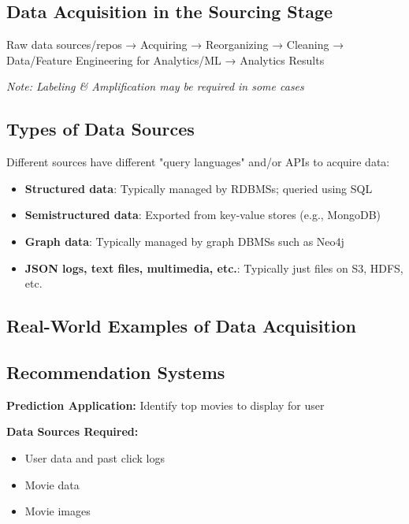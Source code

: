 \documentclass[12pt]{article}
\begin{document}
\subsection{Data Acquisition in the Sourcing Stage}

\begin{tcolorbox}[colback=green!5!white,colframe=green!75!black,title={Sourcing Process Flow}]
Raw data sources/repos → Acquiring → Reorganizing → Cleaning → Data/Feature Engineering for Analytics/ML → Analytics Results

\textit{Note: Labeling \& Amplification may be required in some cases}
\end{tcolorbox}

\subsection{Types of Data Sources}

\begin{tcolorbox}[colback=yellow!5!white,colframe=yellow!75!black,title={Data Sources and Access Methods}]
Different sources have different "query languages" and/or APIs to acquire data:

\begin{itemize}
    \item \textbf{Structured data}: Typically managed by RDBMSs; queried using SQL
    \item \textbf{Semistructured data}: Exported from key-value stores (e.g., MongoDB)
    \item \textbf{Graph data}: Typically managed by graph DBMSs such as Neo4j
    \item \textbf{JSON logs, text files, multimedia, etc.}: Typically just files on S3, HDFS, etc.
\end{itemize}
\end{tcolorbox}

\subsection{Real-World Examples of Data Acquisition}

\subsection{Recommendation Systems}
\begin{tcolorbox}[colback=blue!5!white,colframe=blue!75!black,title={Example: Recommendation System (e.g., Netflix)}]
\textbf{Prediction Application:} Identify top movies to display for user

\textbf{Data Sources Required:}
\begin{itemize}
    \item User data and past click logs
    \item Movie data
    \item Movie images
\end{itemize}
\end{tcolorbox}
\end{document}
